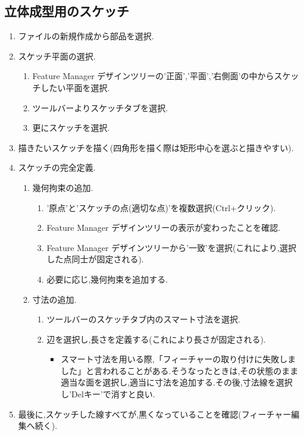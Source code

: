 \documentclass[a4paper,11pt]{jsarticle}
\begin{document}
\subsection{立体成型用のスケッチ}
\begin{enumerate}
 \item ファイルの新規作成から部品を選択.
 \item スケッチ平面の選択.
 \begin{enumerate}
  \item Feature Manager デザインツリーの'正面','平面','右側面'の中からスケッチしたい平面を選択.
  \item ツールバーよりスケッチタブを選択.
  \item 更にスケッチを選択.
 \end{enumerate}
 \item 描きたいスケッチを描く(四角形を描く際は矩形中心を選ぶと描きやすい).
 \item スケッチの完全定義.
 \begin{enumerate}
 \item 幾何拘束の追加.
  \begin{enumerate}
   \item '原点'と'スケッチの点(適切な点)'を複数選択(Ctrl+クリック).
   \item Feature Manager デザインツリーの表示が変わったことを確認.
   \item Feature Manager デザインツリーから'一致'を選択(これにより,選択した点同士が固定される).
   \item 必要に応じ,幾何拘束を追加する.
  \end{enumerate}
 \item 寸法の追加.
  \begin{enumerate}
   \item ツールバーのスケッチタブ内のスマート寸法を選択.
   \item 辺を選択し,長さを定義する(これにより長さが固定される).
   \begin{itemize}
    \item スマート寸法を用いる際,「フィーチャーの取り付けに失敗しました」と言われることがある.そうなったときは,その状態のまま適当な面を選択し,適当に寸法を追加する.その後,寸法線を選択し'Delキー'で消すと良い.
   \end{itemize}
  \end{enumerate}
 \end{enumerate}
 \item 最後に,スケッチした線すべてが,黒くなっていることを確認(フィーチャー編集へ続く).
\end{enumerate}
\end{document}
